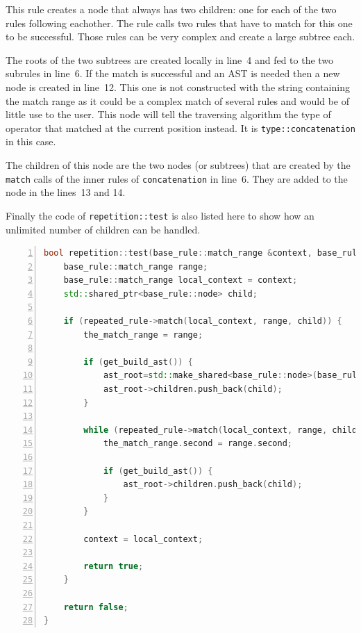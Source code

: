\documentclass[12pt]{article}
\begin{document}
This rule creates a node that always has two children: one for each of the two rules following eachother. The
rule calls two rules that have to match for this one to be successful. Those rules can be very complex and
create a large subtree each.

The roots of the two subtrees are created locally in line~4 and fed to the two subrules in line~6. If the
match is successful and an AST is needed then a new node is created in line~12. This one is not constructed
with the string containing the match range as it could be a complex match of several rules and would be of
little use to the user. This node will tell the traversing algorithm the type of operator that matched at the
current position instead. It is \texttt{type::concatenation} in this case.

The children of this node are the two nodes (or subtrees) that are created by the \texttt{match} calls of the
inner rules of \texttt{concatenation} in line~6. They are added to the node in the lines~13 and 14.

Finally the code of \texttt{repetition::test} is also listed here to show how an unlimited number of children
can be handled.

\begin{center}
	\begin{minipage}[ht]{0.95\textwidth}
		\begin{lstlisting}[language=C++, breaklines=true, numbers=left]
bool repetition::test(base_rule::match_range &context, base_rule::match_range &the_match_range, std::shared_ptr<base_rule::node> &ast_root) {
	base_rule::match_range range;
	base_rule::match_range local_context = context;
	std::shared_ptr<base_rule::node> child;

	if (repeated_rule->match(local_context, range, child)) {
		the_match_range = range;

		if (get_build_ast()) {
			ast_root=std::make_shared<base_rule::node>(base_rule::node::type::repetition);
			ast_root->children.push_back(child);
		}

		while (repeated_rule->match(local_context, range, child)) {
			the_match_range.second = range.second;

			if (get_build_ast()) {
				ast_root->children.push_back(child);
			}
		}

		context = local_context;

		return true;
	}

	return false;
}
		\end{lstlisting}
	\end{minipage}
\end{center}
\end{document}
